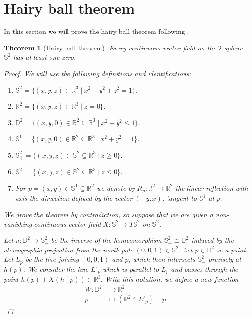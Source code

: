 \documentclass[A4paper, 12pt, british, reqno]{amsart}
\newcommand{\bbD}{\mathbb{D}}
\newcommand{\R}{\mathbb{R}} %
\newcommand{\bbS}{\mathbb{S}}
\theoremstyle{plain}
\newtheorem{thm}{Theorem}[section]
\theoremstyle{definition}
\theoremstyle{remark}
\theoremstyle{plain}
\theoremstyle{definition}
\theoremstyle{remark}
\theoremstyle{plain}
\theoremstyle{definition}
\theoremstyle{remark}
\begin{document}
\section{Hairy ball theorem}

In this section we will prove the hairy ball theorem following \cite{eg79}.

\begin{thm}[Hairy ball theorem]\label{thm:hairyball}
    Every continuous vector field on the $2$-sphere $\bbS^{2}$ has at least one zero.
    \begin{proof}
	We will use the following definitions and identifications:
	\begin{enumerate}[label=\textbullet]
	    \item $\bbS^{2}=\{ (x,y,z)\in \R^{3}\mid x^{2}+y^{2}+z^{2}=1 \}$.
	    \item $\R^{2}=\{ (x,y,z)\in \R^{3}\mid z=0 \}$.
	    \item $\bbD^{2}=\{ (x,y,0)\in \R^{2}\subseteq \R^{3}\mid x^{2}+y^{2}\leqslant 1 \}$.
	    \item $\bbS^{1}=\{ (x,y,0)\in \R^{2}\subseteq \R^{3}\mid x^{2}+y^{2}=1\}$.
	    \item $\bbS^{2}_{+}=\{ (x,y,z)\in \bbS^{2}\subseteq \R^{3}\mid z\geqslant 0 \}$.
	    \item $\bbS^{2}_{-}=\{ (x,y,z)\in \bbS^{2}\subseteq \R^{3}\mid z\leqslant 0 \}$.
	    \item For $p=(x,y)\in \bbS^{1}\subseteq \R^{2}$ we denote by $R_{p}\colon \R^{2}\to \R^{2}$ the linear reflection with axis the direcction defined by the vector $(-y,x)$, tangent to $\bbS^{1}$ at $p$.
	\end{enumerate}

	We prove the theorem by contradiction, so suppose that we are given a non-vanishing continuous vector field $X\colon \bbS^{2}\to T\bbS^{2}$ on $\bbS^{2}$.

	Let $h\colon \bbD^{2}\to \bbS^{2}_{-}$ be the inverse of the homeomorphism $\bbS^{2}_{-}\cong\bbD^{2}$ induced by the stereographic projection from the north pole $(0,0,1)\in \bbS^{2}$.
	Let $p\in \bbD^{2}$ be a point.
	Let $L_{p}$ be the line joining $(0,0,1)$ and $p$, which then intersects $\bbS^{2}_{-}$ precisely at $h(p)$.
	We consider the line $L'_{p}$ which is parallel to $L_{p}$ and passes through the point $h(p)+X(h(p))\in \R^{3}$.
	With this notation, we define a new function
	\begin{align*}
	    W\colon \bbD^{2} &\longrightarrow \R^{2} \\
	    p & \longmapsto (\R^{2}\cap L'_{p})-p.
	\end{align*}


\end{proof}
\end{thm}
\end{document}
